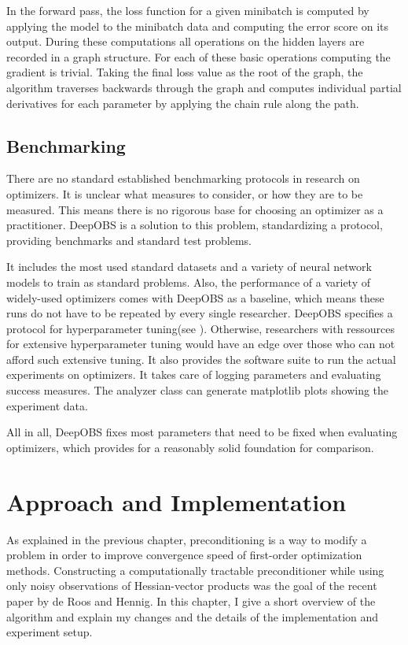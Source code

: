 \documentclass[twoside,12pt,a4paper]{report}
\begin{document}
In the forward pass, the loss function for a given minibatch is computed by applying the model to the minibatch data and computing the error score on its output. During these computations all operations on the hidden layers are recorded in a graph structure. For each of these basic operations computing the gradient is trivial. Taking the final loss value as the root of the graph, the algorithm traverses backwards through the graph and computes individual partial derivatives for each parameter by applying the chain rule along the path.


\section{Benchmarking}
There are no standard established benchmarking protocols in research on optimizers. It is unclear what measures to consider, or how they are to be measured. This means there is no rigorous base for choosing an optimizer as a practitioner.
DeepOBS is a solution to this problem, standardizing a protocol, providing benchmarks and standard test problems.

It includes the most used standard datasets and a variety of neural network models to train as standard problems. Also, the performance of a variety of widely-used optimizers comes with DeepOBS as a baseline, which means these runs do not have to be repeated by every single researcher.
DeepOBS specifies a protocol for hyperparameter tuning(see \cite{abahde}). Otherwise, researchers with ressources for extensive hyperparameter tuning would have an edge over those who can not afford such extensive tuning.
It also provides the software suite to run the actual experiments on optimizers. It takes care of logging parameters and evaluating success measures.
The analyzer class can generate matplotlib plots showing the experiment data.

All in all, DeepOBS fixes most parameters that need to be fixed when evaluating optimizers, which provides for a reasonably solid foundation for comparison.



\chapter{Approach and Implementation}
As explained in the previous chapter, preconditioning is a way to modify a problem in order to improve convergence speed of first-order optimization methods. Constructing a computationally tractable preconditioner while using only noisy observations of Hessian-vector products was the goal of the recent paper by de Roos and Hennig. In this chapter, I give a short overview of the algorithm and explain my changes and the details of the implementation and experiment setup.
\end{document}
